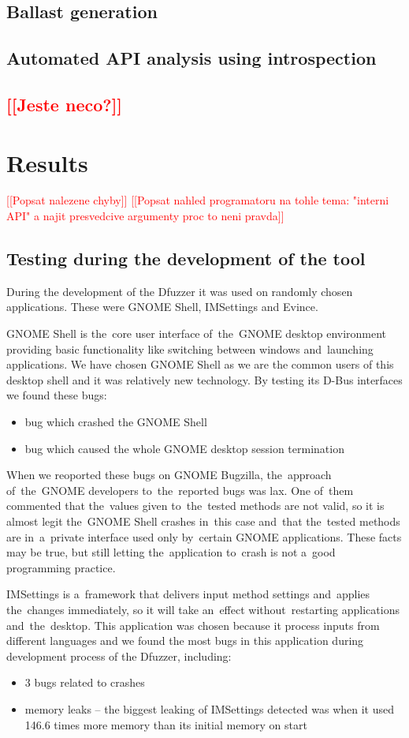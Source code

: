 \documentclass[conference]{IEEEtran}
\newcommand{\addtodo}[1]{\textcolor{red}{[[#1]]}}
\newcommand{\dummytext}{\textcolor{light-gray}{\Blindtext}}
\begin{document}
\subsection{Ballast generation}
\dummytext
\subsection{Automated API analysis using introspection}
\dummytext
\subsection{\addtodo{Jeste neco?}}
\dummytext


\section{Results}
\addtodo{Popsat nalezene chyby}
\addtodo{Popsat nahled programatoru na tohle tema: "interni API" a najit presvedcive argumenty proc to neni pravda}
\subsection{Testing during the development of the tool}
During the development of the Dfuzzer it was used on randomly chosen applications.
These were GNOME Shell, IMSettings and Evince.

GNOME Shell is the~core user interface of~the~GNOME desktop environment
providing basic functionality like switching between windows and~launching
applications. We have chosen GNOME Shell as we are the common users of this
desktop shell and it was relatively new technology. By testing its D-Bus
interfaces we found these bugs:
\begin{itemize}
	\item bug which crashed the GNOME Shell
	\item bug which caused the whole GNOME desktop session termination
\end{itemize}
When we reoported these bugs on GNOME Bugzilla, the~approach of~the~GNOME
developers to~the~reported bugs was lax. One of~them commented that the~values
given to~the~tested methods are not valid, so it is almost legit
the~GNOME Shell crashes in~this case and~that the~tested methods are
in~a~private interface used only by~certain GNOME applications. These facts may
be true, but still letting the~application to~crash is not a~good programming
practice.

IMSettings is a~framework that delivers input method settings and~applies the~changes
immediately, so it will take an~effect without~restarting applications
and~the~desktop. This application was chosen because it process inputs
from different languages and we found the most bugs in this application during
development process of the Dfuzzer, including:
\begin{itemize}
	\item 3 bugs related to crashes
	\item memory leaks -- the biggest leaking of IMSettings detected was when it
		used 146.6 times more memory than its initial memory on start
\end{itemize}
\end{document}

